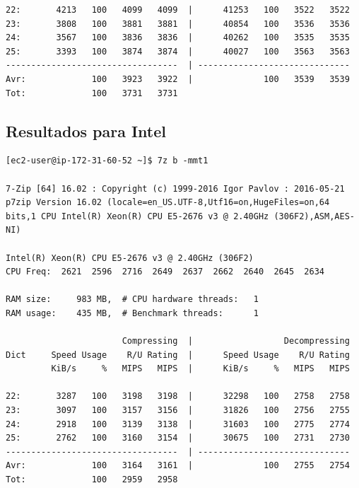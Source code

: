 \documentclass[a4paper,openright,12pt]{article}
\begin{document}
\begin{appendices}
\begin{verbatim}
22:       4213   100   4099   4099  |      41253   100   3522   3522
23:       3808   100   3881   3881  |      40854   100   3536   3536
24:       3567   100   3836   3836  |      40262   100   3535   3535
25:       3393   100   3874   3874  |      40027   100   3563   3563
----------------------------------  | ------------------------------
Avr:             100   3923   3922  |              100   3539   3539
Tot:             100   3731   3731
\end{verbatim}
\newpage
\subsection{Resultados para Intel}
\begin{verbatim}
[ec2-user@ip-172-31-60-52 ~]$ 7z b -mmt1

7-Zip [64] 16.02 : Copyright (c) 1999-2016 Igor Pavlov : 2016-05-21
p7zip Version 16.02 (locale=en_US.UTF-8,Utf16=on,HugeFiles=on,64 bits,1 CPU Intel(R) Xeon(R) CPU E5-2676 v3 @ 2.40GHz (306F2),ASM,AES-NI)

Intel(R) Xeon(R) CPU E5-2676 v3 @ 2.40GHz (306F2)
CPU Freq:  2621  2596  2716  2649  2637  2662  2640  2645  2634

RAM size:     983 MB,  # CPU hardware threads:   1
RAM usage:    435 MB,  # Benchmark threads:      1

                       Compressing  |                  Decompressing
Dict     Speed Usage    R/U Rating  |      Speed Usage    R/U Rating
         KiB/s     %   MIPS   MIPS  |      KiB/s     %   MIPS   MIPS

22:       3287   100   3198   3198  |      32298   100   2758   2758
23:       3097   100   3157   3156  |      31826   100   2756   2755
24:       2918   100   3139   3138  |      31603   100   2775   2774
25:       2762   100   3160   3154  |      30675   100   2731   2730
----------------------------------  | ------------------------------
Avr:             100   3164   3161  |              100   2755   2754
Tot:             100   2959   2958
\end{verbatim}

\end{appendices}
\end{document}

